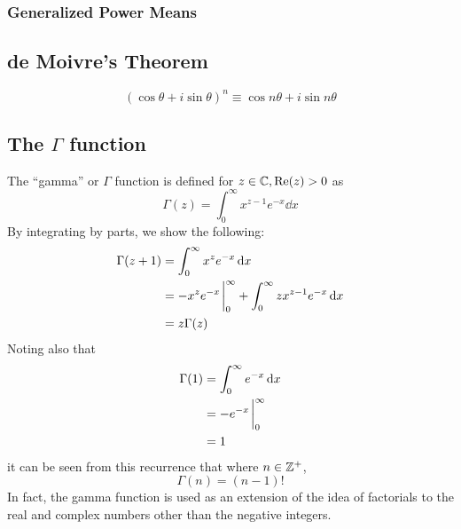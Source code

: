 \subsubsection{Generalized Power Means}

\subsection{de Moivre's Theorem}

\begin{equation}
(\cos \theta + i \sin \theta)^n \equiv \cos n\theta + i \sin n\theta
\end{equation}

\subsection[The \(\Gamma\) function]
           {The \boldmath\(\Gamma\) function}

The ``gamma'' or \(\Gamma\) function is defined for
\(z \in \mathbb C, \Re(z) > 0\) as
\begin{equation}
\Gamma(z) = \int_0^{\infty} x^{z - 1}e^{-x} \dd{x}
\end{equation}
By integrating by parts, we show the following:
\begin{align*}
\Gamma(z + 1) &= \int_0^\infty x^{z}e^{-x} \dd{x} \\
              &= -x^{z} e^{-x}\eval_0^\infty
                 + \int_0^\infty zx^{z - 1}e^{-x} \dd{x} \\
              &= z\Gamma(z)
\end{align*}
Noting also that
\begin{align*}
\Gamma(1) &= \int_0^\infty e^{-x} \dd{x} \\
          &= -e^{-x}\eval_0^\infty \\
          &= 1
\end{align*}
it can be seen from this recurrence that where \(n \in \mathbb Z^+\),
\begin{equation}
\Gamma(n) = (n - 1)!
\end{equation}
In fact, the gamma function is used as an extension of the idea of
factorials to the real and complex numbers other than the negative integers.

